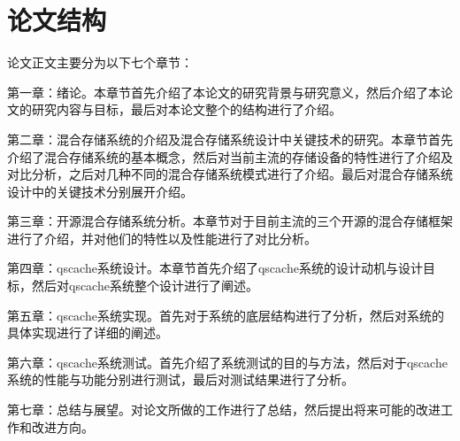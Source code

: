 \section{论文结构}

论文正文主要分为以下七个章节： 

第一章：绪论。本章节首先介绍了本论文的研究背景与研究意义，然后介绍了本论文的研究内容与目标，最后对本论文整个的结构进行了介绍。

第二章：混合存储系统的介绍及混合存储系统设计中关键技术的研究。本章节首先介绍了混合存储系统的基本概念，然后对当前主流的存储设备的特性进行了介绍及对比分析，之后对几种不同的混合存储系统模式进行了介绍。最后对混合存储系统设计中的关键技术分别展开介绍。

第三章：开源混合存储系统分析。本章节对于目前主流的三个开源的混合存储框架进行了介绍，并对他们的特性以及性能进行了对比分析。

第四章：qscache系统设计。本章节首先介绍了qscache系统的设计动机与设计目标，然后对qscache系统整个设计进行了阐述。 

第五章：qscache系统实现。首先对于系统的底层结构进行了分析，然后对系统的具体实现进行了详细的阐述。 

第六章：qscache系统测试。首先介绍了系统测试的目的与方法，然后对于qscache系统的性能与功能分别进行测试，最后对测试结果进行了分析。 

第七章：总结与展望。对论文所做的工作进行了总结，然后提出将来可能的改进工作和改进方向。

